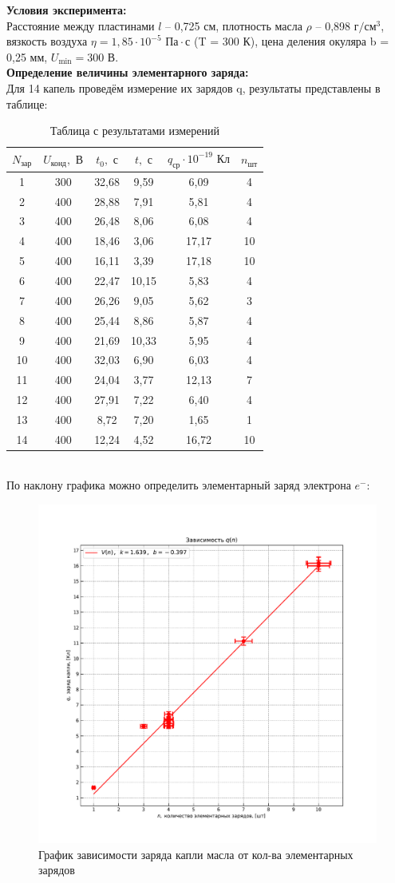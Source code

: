 \documentclass[a4paper,12pt]{article} %
\begin{document}
\noindent
\textbf{Условия эксперимента:}
\\
Расстояние между пластинами $l$ -- 0,725 см, плотность масла $\rho$ -- 0,898 $\text{г}/\text{см}^3$, вязкость воздуха $\eta = 1,85 \cdot 10^{-5} \text{ Па} \cdot \text{с}$ (T = 300 К), цена деления окуляра b = 0,25 мм, $U_\text{min} = 300 \text{ В}$.
\\
\textbf{Определение величины элементарного заряда:}
\\
Для 14 капель проведём измерение их зарядов q, результаты представлены в таблице:
\begin{table}[ht]
\centering
\begin{tabular}{|c|c|c|c|c|c|}
\hline
$N_\text{зар}$ & $U_\text{конд}, \text{ В}$ & $t_0, \text{ с}$ & $t, \text{ с}$ & $q_\text{ср} \cdot 10^{-19}\text{ Кл}$ & $n_\text{шт}$ \\
\hline
1 & 300 & 32,68 & 9,59 & 6,09 & 4 \\
2 & 400 & 28,88 & 7,91 & 5,81 & 4 \\
3 & 400 & 26,48 & 8,06 & 6,08 & 4 \\
4 & 400 & 18,46 & 3,06 & 17,17 & 10 \\
5 & 400 & 16,11 & 3,39 & 17,18 & 10 \\
6 & 400 & 22,47 & 10,15 & 5,83 & 4 \\
7 & 400 & 26,26 & 9,05 & 5,62 & 3 \\
8 & 400 & 25,44 & 8,86 & 5,87 & 4 \\
9 & 400 & 21,69 & 10,33 & 5,95 & 4 \\
10 & 400 & 32,03 & 6,90 & 6,03 & 4 \\
11 & 400 & 24,04 & 3,77 & 12,13 & 7 \\
12 & 400 & 27,91 & 7,22 & 6,40 & 4 \\
13 & 400 & 8,72 & 7,20 & 1,65 & 1 \\
14 & 400 & 12,24 & 4,52 & 16,72 & 10 \\
\hline
\end{tabular}
\caption{Таблица с результатами измерений}
\end{table}
\\
По наклону графика можно определить элементарный заряд электрона $e^{-}$: 
\begin{figure}[h!]
    \centering
    \includegraphics[width=0.6\linewidth]{graphic-24.pdf}
    \caption{График зависимости заряда капли масла от кол-ва элементарных зарядов}
    \label{fig:enter-label}
\end{figure}
\end{document}
